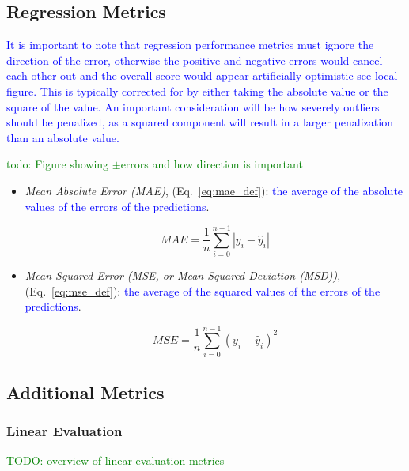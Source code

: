 \subsection{Regression Metrics}

\textcolor{blue}{It is important to note that regression performance metrics must ignore the direction of the error, otherwise the positive and negative errors would cancel each other out and the overall score would appear artificially optimistic \textcolor{blue}{see local figure}. This is typically corrected for by either taking the absolute value or the square of the value. An important consideration will be how severely outliers should be penalized, as a squared component will result in a larger penalization than an absolute value.}

\textcolor{green}{todo: Figure showing $\pm$errors and how direction is important}



\begin{itemize}
\item \textit{Mean Absolute Error (MAE)}, (Eq.~\ref{eq:mae_def}): \textcolor{blue}{the average of the absolute values of the errors of the predictions}.
	
\begin{equation}
{MAE = \frac{1}{n}\sum_{i=0}^{n-1}|y_i - \hat{y}_i| }
\label{eq:mae_def}
\end{equation}
	
\item \textit{Mean Squared Error (MSE, or Mean Squared Deviation (MSD))}, (Eq.~\ref{eq:mse_def}): \textcolor{blue}{the average of the squared values of the errors of the predictions}.
	
\begin{equation}
{MSE = \frac{1}{n}\sum_{i=0}^{n-1}(y_i - \hat{y}_i)^2}
\label{eq:mse_def}
\end{equation}
	
\end{itemize}


\subsection{Additional Metrics}


\subsubsection{Linear Evaluation}

\textcolor{green}{TODO: overview of linear evaluation metrics}

